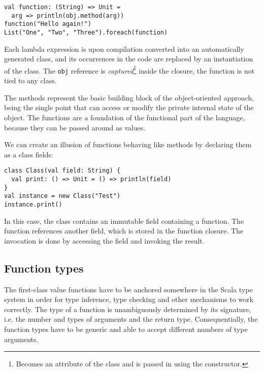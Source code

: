 \lstset{style=Scala}
\begin{lstlisting}
val function: (String) => Unit = 
  arg => println(obj.method(arg))
function("Hello again!")
List("One", "Two", "Three").foreach(function)
\end{lstlisting}

Each lambda expression is upon compilation converted into an automatically generated class, and its occurrences in the code are replaced by an instantiation of the class. The \lstinline|obj| reference is \textit{captured}\footnote{Becomes an attribute of the class and is passed in using the constructor.} inside the closure, the function is not tied to any class. 

The methods represent the basic building block of the object-oriented approach, being the single point that can access or modify the private internal state of the object. The functions are a foundation of the functional part of the language, because they can be passed around as values.

We can create an illusion of functions behaving like methods by declaring them as a class fields:

\lstset{style=Scala}
\begin{lstlisting}
class Class(val field: String) {
  val print: () => Unit = () => println(field)
}
val instance = new Class("Test")
instance.print()
\end{lstlisting}

In this case, the class contains an immutable field  containing a function. The function references another field, which is stored in the function closure. The invocation is done by accessing the  field and invoking the result.


\subsection{Function types}
\label{subsec:functiontypes}

The first-class value functions have to be anchored somewhere in the Scala type system in order for type inference, type checking and other mechanisms to work correctly. The type of a function is unambiguously determined by its signature, i.e. the number and types of arguments and the return type. Consequentially, the function types have to be generic and able to accept different numbers of type arguments.

